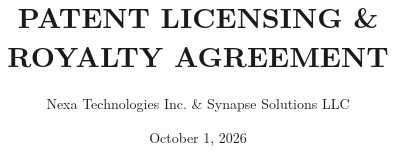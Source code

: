 \documentclass[11pt,letterpaper]{article}
\title{\sffamily\bfseries PATENT LICENSING \& ROYALTY AGREEMENT}
\author{Nexa Technologies Inc. \& Synapse Solutions LLC}
\date{October 1, 2026}
\begin{document}







\clearpage
\nocite{*}


\end{document}
